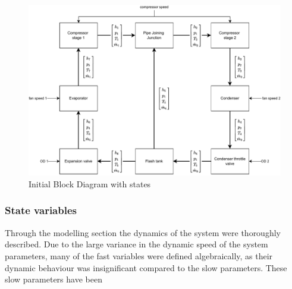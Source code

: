 
\begin{figure}[h!]
	\centering
	\includegraphics[width=1\textwidth]{Graphics/Block_Diagram.pdf}
	\caption{Initial Block Diagram with states}
	\label{fig:Block_diagram}
\end{figure}

\subsubsection{State variables}

Through the modelling section the dynamics of the system were thoroughly described. Due to the large variance in the dynamic speed of the system parameters, many of the fast variables were defined algebraically, as their dynamic behaviour was insignificant compared to the slow parameters. These slow parameters have been 


